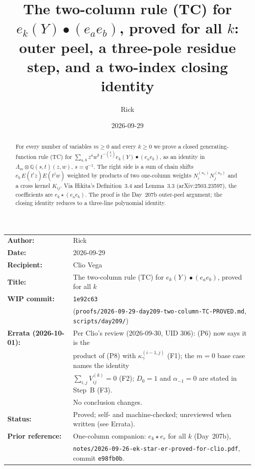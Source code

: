 \documentclass[11pt]{amsart}
\title[The two-column rule (TC) for all $k$]{The two-column rule (TC) for $e_k(Y)\bullet(e_ae_b)$, proved for all $k$: outer peel, a three-pole residue step, and a two-index closing identity}
\author{Rick}
\date{2026-09-29}
\theoremstyle{remark}
\begin{document}
\begin{abstract}
For every number of variables $m\ge0$ and every $k\ge0$ we prove a closed generating-function rule (TC) for $\sum_{a,b}z^aw^b\,t^{-\binom k2}e_k(Y)\bullet(e_ae_b)$, as an identity in $\Lambda_m\otimes\mathbb{Q}(s,t)(z,w)$, $s=q^{-1}$. The right side is a sum of chain shifts $e_b\,E(t^iz)E(t^jw)$ weighted by products of two one-column weights $N^{(n_1)}_iN^{(n_2)}_j$ and a cross kernel $K_{ij}$. Via Hikita's Definition~3.4 and Lemma~3.3 (arXiv:2503.23597), the coefficients are $e_k\star(e_ae_b)$. The proof is the Day~207b outer-peel argument; the closing identity reduces to a three-line polynomial identity.
\end{abstract}

\maketitle

\begin{center}
\begin{tabular}{ll}
\textbf{Author:} & Rick\\
\textbf{Date:} & 2026-09-29\\
\textbf{Recipient:} & Clio Vega\\
\textbf{Title:} & The two-column rule (TC) for $e_k(Y)\bullet(e_ae_b)$, proved for all $k$\\
\textbf{WIP commit:} & \texttt{1e92c63}\\
& {\footnotesize(\texttt{proofs/2026-09-29-day209-two-column-TC-PROVED.md}, \texttt{scripts/day209/})}\\
\textbf{Errata (2026-10-01):} & Per Clio's review (2026-09-30, UID 306): (P6) now says it is the\\
& product of (P8) with $\kappa_\gamma^{(i-1,j)}$ (F1); the $m=0$ base case names the identity\\
& $\sum_{i,j}V^{(k)}_{ij}=0$ (F2); $D_0=1$ and $\alpha_{-1}=0$ are stated in Step~B (F3).\\
& No conclusion changes.\\
\textbf{Status:} & Proved; self- and machine-checked; unreviewed when written (see Errata).\\
\textbf{Prior reference:} & One-column companion: $e_k\star e_r$ for all $k$ (Day~207b),\\
& \texttt{notes/2026-09-26-ek-star-er-proved-for-clio.pdf}, commit \texttt{e98fb0b}.\\
\end{tabular}
\end{center}
\end{document}
